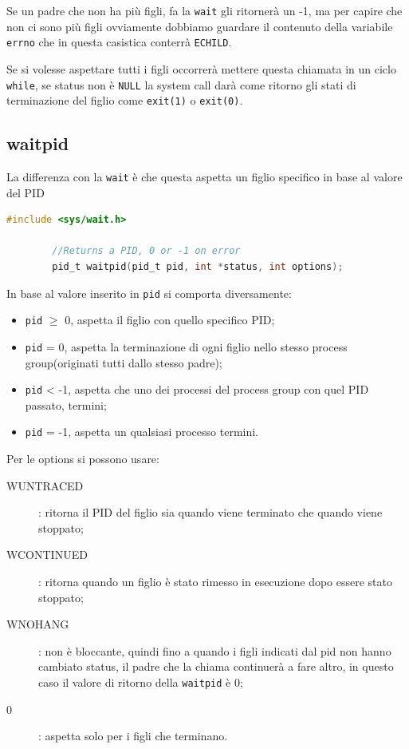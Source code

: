 \documentclass[a4paper, 12pt]{book}
\begin{document}
    Se un padre che non ha più figli, fa la \verb|wait| gli ritornerà 
    un -1, ma per capire che non ci sono più figli ovviamente 
    dobbiamo guardare il contenuto della variabile \verb|errno|
    che in questa casistica conterrà \verb|ECHILD|.

    Se si volesse aspettare tutti i figli occorrerà mettere questa 
    chiamata in un ciclo \verb|while|, se status non è \verb|NULL|
    la system call darà come ritorno gli stati di terminazione del figlio 
    come \verb|exit(1)| o \verb|exit(0)|.

    \subsection{waitpid}

    La differenza con la \verb|wait| è che questa aspetta un figlio 
    specifico in base al valore del PID
    \begin{lstlisting}[language=C]
        #include <sys/wait.h>

        //Returns a PID, 0 or -1 on error
        pid_t waitpid(pid_t pid, int *status, int options);
    \end{lstlisting}
    In base al valore inserito in \verb|pid| si comporta diversamente:
    \begin{itemize}
        \item \verb|pid| $\ge$ 0, aspetta il figlio con quello specifico PID;
        \item \verb|pid| = 0, aspetta la terminazione di ogni figlio nello stesso process group(originati tutti dallo stesso padre);
        \item \verb|pid| < -1, aspetta che uno dei processi del process group con quel PID passato, termini;
        \item \verb|pid| = -1, aspetta un qualsiasi processo termini.
    \end{itemize}
    Per le options si possono usare:
    \begin{description}
        \item[WUNTRACED]: ritorna il PID del figlio sia quando viene terminato che quando viene stoppato;
        \item[WCONTINUED]: ritorna quando un figlio è stato rimesso in esecuzione dopo essere stato stoppato;
        \item[WNOHANG]: non è bloccante, quindi fino a quando i figli indicati dal pid non hanno cambiato status, il padre che la chiama continuerà a fare altro, in questo caso il valore di ritorno della \verb|waitpid| è 0;
        \item[0]: aspetta solo per i figli che terminano.    
    \end{description}
\end{document}
